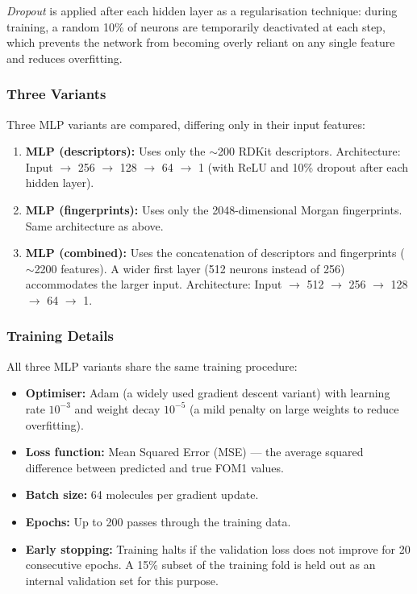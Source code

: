 \documentclass[11pt,a4paper]{article}
\begin{document}
\emph{Dropout} is applied after each hidden layer as a regularisation technique: during training, a random 10\% of neurons are temporarily deactivated at each step, which prevents the network from becoming overly reliant on any single feature and reduces overfitting.

\subsubsection*{Three Variants}

Three MLP variants are compared, differing only in their input features:

\begin{enumerate}
    \item \textbf{MLP (descriptors):} Uses only the $\sim$200 RDKit descriptors. Architecture: Input $\rightarrow$ 256 $\rightarrow$ 128 $\rightarrow$ 64 $\rightarrow$ 1 (with ReLU and 10\% dropout after each hidden layer).

    \item \textbf{MLP (fingerprints):} Uses only the 2048-dimensional Morgan fingerprints. Same architecture as above.

    \item \textbf{MLP (combined):} Uses the concatenation of descriptors and fingerprints ($\sim$2200 features). A wider first layer (512 neurons instead of 256) accommodates the larger input. Architecture: Input $\rightarrow$ 512 $\rightarrow$ 256 $\rightarrow$ 128 $\rightarrow$ 64 $\rightarrow$ 1.
\end{enumerate}

\subsubsection*{Training Details}

All three MLP variants share the same training procedure:
\begin{itemize}
    \item \textbf{Optimiser:} Adam (a widely used gradient descent variant) with learning rate $10^{-3}$ and weight decay $10^{-5}$ (a mild penalty on large weights to reduce overfitting).
    \item \textbf{Loss function:} Mean Squared Error (MSE) --- the average squared difference between predicted and true FOM1 values.
    \item \textbf{Batch size:} 64 molecules per gradient update.
    \item \textbf{Epochs:} Up to 200 passes through the training data.
    \item \textbf{Early stopping:} Training halts if the validation loss does not improve for 20 consecutive epochs. A 15\% subset of the training fold is held out as an internal validation set for this purpose.
\end{itemize}
\end{document}
